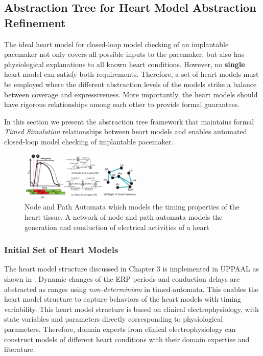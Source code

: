 \subsection{Abstraction Tree for Heart Model Abstraction Refinement}
The ideal heart model for closed-loop model checking of an implantable pacemaker not only covers all possible inputs to the pacemaker, but also has physiological explanations to all known heart conditions.
However, no \textbf{single} heart model can satisfy both requirements.
Therefore, a set of heart models must be employed where the different abstraction levels of the models strike a balance between coverage and expressiveness.
More importantly, the heart models should have rigorous relationships among each other to provide formal guarantees.

In this section we present the abstraction tree framework that maintains formal \emph{Timed Simulation} relationships between heart models and enables automated closed-loop model checking of implantable pacemaker. %
\begin{figure}[!t]
	\centering
	\includegraphics[width=0.52\textwidth]{figs/init_abs.pdf}
	\caption{\small Node and Path Automata which models the timing properties of the heart tissue. A network of node and path automata models the generation and conduction of electrical activities of a heart}
	\label{fig:nodepathTA}
\end{figure}
\subsubsection{Initial Set of Heart Models}
The heart model structure discussed in Chapter 3 is implemented in UPPAAL as shown in .
Dynamic changes of the ERP periods and conduction delays are abstracted as ranges using \emph{non-determinism} in timed-automata.
This enables the heart model structure to capture behaviors of the heart models with timing variability.
This heart model structure is based on clinical electrophysiology, with state variables and parameters directly corresponding to physiological parameters.
Therefore, domain experts from clinical electrophysiology can construct models of different heart conditions with their domain expertise and literature.

